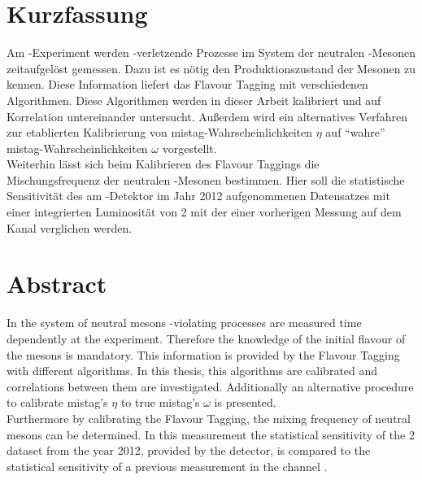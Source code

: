 \section*{Kurzfassung}

Am \lhcb-Experiment werden \CP-verletzende Prozesse im System der neutralen \Bz-Mesonen zeitaufgelöst gemessen. Dazu ist es nötig den Produktionszustand der Mesonen zu kennen. Diese Information liefert das Flavour Tagging mit verschiedenen Algorithmen. Diese Algorithmen werden in dieser Arbeit kalibriert und auf Korrelation untereinander untersucht. Außerdem wird ein alternatives Verfahren zur etablierten Kalibrierung von mistag-Wahrscheinlichkeiten $\eta$ auf \enquote{wahre} mistag-Wahrscheinlichkeiten $\omega$ vorgestellt.\\
Weiterhin lässt sich beim Kalibrieren des Flavour Taggings die Mischungsfrequenz \dmd der neutralen \Bz-Mesonen bestimmen. Hier soll die statistische Sensitivität des am \lhcb-Detektor im Jahr \num{2012} aufgenommenen Datensatzes mit einer integrierten Luminosität von \SI{2}{\invfb} mit der einer vorherigen Messung auf dem Kanal \BdToDpi \cite{dmd_messung} verglichen werden.

\section*{Abstract}

In the system of neutral \Bz mesons  \CP-violating processes are measured time dependently at the \lhcb experiment. Therefore the knowledge of the initial flavour of the mesons is mandatory. This information is provided by the Flavour Tagging with different algorithms. In this thesis, this algorithms are calibrated and correlations between them are investigated. Additionally an alternative procedure to calibrate mistag's $\eta$ to true mistag's $\omega$ is presented.\\
Furthermore by calibrating the Flavour Tagging, the mixing frequency \dmd of neutral \Bz mesons can be determined. In this measurement the statistical sensitivity of the \SI{2}{\invfb} dataset from the year \num{2012}, provided by the \lhcb detector, is compared to the statistical sensitivity of a previous measurement in the channel \BdToDpi \cite{dmd_messung}.
